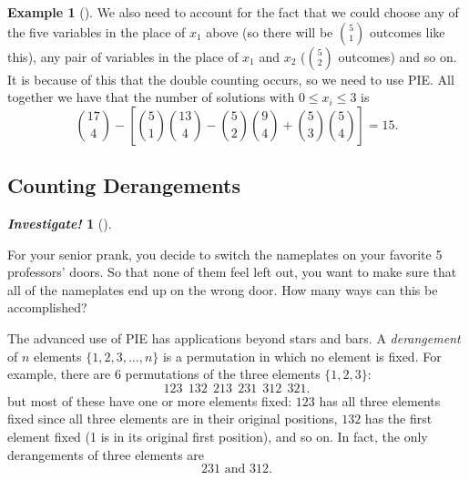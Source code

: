 \documentclass[10pt,]{book}
\theoremstyle{plain}
\theoremstyle{definition}
\newtheorem{example}[theorem]{Example}
\theoremstyle{definition}
\newtheorem{investigation}[project]{\emph{Investigate!}}
\theoremstyle{definition}
\numberwithin{equation}{section}
\begin{document}
\begin{example}[]
          We also need to account for the fact that we could choose any of the five variables in the place of \(x_1\) above (so there will be \({5 \choose 1}\) outcomes like this), any pair of variables in the place of \(x_1\) and \(x_2\) (\({5 \choose 2}\) outcomes) and so on. It is because of this that the double counting occurs, so we need to use PIE. All together we have that the number of solutions with \(0 \le x_i \le 3\) is
          \begin{equation*}
            {17 \choose 4} - \left[{5\choose 1}{13 \choose 4} - {5 \choose 2}{9 \choose 4} + {5 \choose 3}{5 \choose 4}\right] = 15.
          \end{equation*}
\end{example}
\typeout{************************************************}
\typeout{************************************************}
\subsection[Counting Derangements]{Counting Derangements}\label{subsec_derangements}
\begin{investigation}[]\label{investigation-12}

        For your senior prank, you decide to switch the nameplates on your favorite 5 professors' doors. So that none of them feel left out, you want to make sure that all of the nameplates end up on the wrong door. How many ways can this be accomplished?
\end{investigation}

      The advanced use of PIE has applications beyond stars and bars. A \emph{derangement} of \(n\) elements \(\{1,2,3,\ldots, n\}\) is a permutation in which no element is fixed. For example, there are \(6\) permutations of the three elements \(\{1,2,3\}\):
      \begin{equation*}
        123 ~~ 132 ~~ 213 ~~ 231 ~~ 312 ~~ 321.
      \end{equation*}
      but most of these have one or more elements fixed: \(123\) has all three elements fixed since all three elements are in their original positions, \(132\) has the first element fixed (1 is in its original first position), and so on. In fact, the only derangements of three elements are
      \begin{equation*}
        231 \text{ and } 312.
      \end{equation*}
\par
\end{document}
